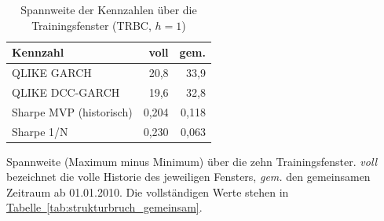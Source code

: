 \begin{table}[htbp]
  \centering
  \footnotesize
  \begin{tabular}{lrr}
    \toprule
    Kennzahl & voll & gem. \\
    \midrule
    QLIKE GARCH & 20,8 & 33,9 \\
    QLIKE DCC-GARCH & 19,6 & 32,8 \\
    Sharpe MVP (historisch) & 0,204 & 0,118 \\
    Sharpe 1/N & 0,230 & 0,063 \\
    \bottomrule
  \end{tabular}
  \caption{Spannweite der Kennzahlen über die Trainingsfenster (TRBC, $h=1$)}
  \label{tab:strukturbruch_kompakt}
  \begin{minipage}{\linewidth}\vspace{0.4em}\centering\footnotesize
  Spannweite (Maximum minus Minimum) über die zehn Trainingsfenster. \emph{voll} bezeichnet die volle Historie des jeweiligen Fensters, \emph{gem.} den gemeinsamen Zeitraum ab 01.01.2010. Die vollständigen Werte stehen in \hyperref[tab:strukturbruch_gemeinsam]{Tabelle~\ref*{tab:strukturbruch_gemeinsam}}.
  \end{minipage}
\end{table}
